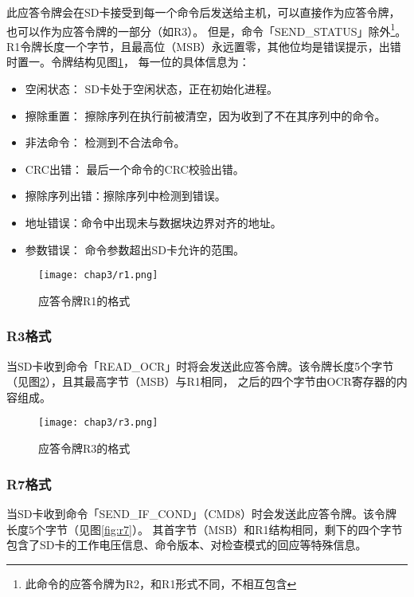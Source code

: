 此应答令牌会在SD卡接受到每一个命令后发送给主机，可以直接作为应答令牌，也可以作为应答令牌的一部分（如R3）。
但是，命令「SEND\_STATUS」除外\footnote{此命令的应答令牌为R2，和R1形式不同，不相互包含}。
R1令牌长度一个字节，且最高位（MSB）永远置零，其他位均是错误提示，出错时置一。令牌结构见图\ref{fig:r1}，
每一位的具体信息为：
\begin{itemize}
    \item 空闲状态： SD卡处于空闲状态，正在初始化进程。
    \item 擦除重置： 擦除序列在执行前被清空，因为收到了不在其序列中的命令。
    \item 非法命令： 检测到不合法命令。
    \item CRC出错：  最后一个命令的CRC校验出错。
    \item 擦除序列出错：擦除序列中检测到错误。
    \item 地址错误：命令中出现未与数据块边界对齐的地址。
    \item 参数错误： 命令参数超出SD卡允许的范围。
\end{itemize}

\begin{figure}[!htb]
    \centering
    \texttt{[image: chap3/r1.png]}
    \\
    \caption{应答令牌R1的格式}\label{fig:r1}
\end{figure}

\subsubsection{R3格式}
\label{sec:r3}

当SD卡收到命令「READ\_OCR」时将会发送此应答令牌。该令牌长度5个字节（见图\ref{fig:r3}），且其最高字节（MSB）与R1相同，
之后的四个字节由OCR寄存器的内容组成。

\begin{figure}[!htb]
    \centering
    \texttt{[image: chap3/r3.png]}
    \\
    \caption{应答令牌R3的格式}\label{fig:r3}
\end{figure}

\subsubsection{R7格式}
\label{sec:r7}

当SD卡收到命令「SEND\_IF\_COND」（CMD8）时会发送此应答令牌。该令牌长度5个字节（见图\ref{fig:r7}）。
其首字节（MSB）和R1结构相同，剩下的四个字节包含了SD卡的工作电压信息、命令版本、对检查模式的回应等特殊信息。


